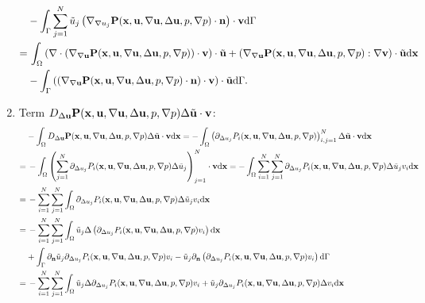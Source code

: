 \documentclass[oneside]{book}
\numberwithin{equation}{section}
\begin{document}
\begin{enumerate}[leftmargin=0in]
\begin{align*}
        &- \int_\Gamma \sum_{j=1}^N \tilde{u}_j\left(\nabla_{\nabla u_j}{\bf P}({\bf x},{\bf u},\nabla{\bf u},\Delta{\bf u},p,\nabla p)\cdot{\bf n}\right)\cdot{\bf v}{\rm d}\Gamma\\
        =&\, \int_\Omega \left(\nabla\cdot\left(\nabla_{\nabla{\bf u}}{\bf P}({\bf x},{\bf u},\nabla{\bf u},\Delta{\bf u},p,\nabla p)\right)\cdot{\bf v}\right)\cdot\tilde{\bf u} + \left(\nabla_{\nabla{\bf u}}{\bf P}({\bf x},{\bf u},\nabla{\bf u},\Delta{\bf u},p,\nabla p):\nabla{\bf v}\right)\cdot\tilde{\bf u}{\rm d}{\bf x}\\
        &- \int_\Gamma \left(\left(\nabla_{\nabla{\bf u}}{\bf P}({\bf x},{\bf u},\nabla{\bf u},\Delta{\bf u},p,\nabla p)\cdot{\bf n}\right)\cdot{\bf v}\right)\cdot\tilde{\bf u}{\rm d}\Gamma.
    \end{align*}
    \item Term $D_{\Delta{\bf u}}{\bf P}({\bf x},{\bf u},\nabla{\bf u},\Delta{\bf u},p,\nabla p)\Delta\tilde{\bf u}\cdot{\bf v}$:
    \begin{align*}
        &-\int_\Omega D_{\Delta{\bf u}}{\bf P}({\bf x},{\bf u},\nabla{\bf u},\Delta{\bf u},p,\nabla p)\Delta\tilde{\bf u}\cdot{\bf v}{\rm d}{\bf x} = -\int_\Omega \left(\partial_{\Delta u_j}P_i({\bf x},{\bf u},\nabla{\bf u},\Delta{\bf u},p,\nabla p)\right)_{i,j=1}^N\Delta\tilde{\bf u}\cdot{\bf v}{\rm d}{\bf x}\\
        =&\, -\int_\Omega \left(\sum_{j=1}^N \partial_{\Delta u_j}P_i({\bf x},{\bf u},\nabla{\bf u},\Delta{\bf u},p,\nabla p)\Delta\tilde{u}_j\right)_{j=1}^N\cdot{\bf v}{\rm d}{\bf x} = -\int_\Omega \sum_{i=1}^N\sum_{j=1}^N \partial_{\Delta u_j}P_i({\bf x},{\bf u},\nabla{\bf u},\Delta{\bf u},p,\nabla p)\Delta\tilde{u}_jv_i{\rm d}{\bf x}\\
        =&\, -\sum_{i=1}^N\sum_{j=1}^N \int_\Omega \partial_{\Delta u_j}P_i({\bf x},{\bf u},\nabla{\bf u},\Delta{\bf u},p,\nabla p)\Delta\tilde{u}_jv_i{\rm d}{\bf x}\\
        =&\, -\sum_{i=1}^N\sum_{j=1}^N \int_\Omega \tilde{u}_j\Delta\left(\partial_{\Delta u_j}P_i({\bf x},{\bf u},\nabla{\bf u},\Delta{\bf u},p,\nabla p)v_i\right){\rm d}{\bf x}\\
        &+ \int_\Gamma \partial_{\bf n}\tilde{u}_j\partial_{\Delta u_j}P_i({\bf x},{\bf u},\nabla{\bf u},\Delta{\bf u},p,\nabla p)v_i - \tilde{u}_j\partial_{\bf n}\left(\partial_{\Delta u_j}P_i({\bf x},{\bf u},\nabla{\bf u},\Delta{\bf u},p,\nabla p)v_i\right){\rm d}\Gamma\\
        =&\, -\sum_{i=1}^N\sum_{j=1}^N \int_\Omega \tilde{u}_j\Delta\partial_{\Delta u_j}P_i({\bf x},{\bf u},\nabla{\bf u},\Delta{\bf u},p,\nabla p)v_i + \tilde{u}_j\partial_{\Delta u_j}P_i({\bf x},{\bf u},\nabla{\bf u},\Delta{\bf u},p,\nabla p)\Delta v_i{\rm d}{\bf x}\\

\end{align*}
\end{enumerate}
\end{document}
